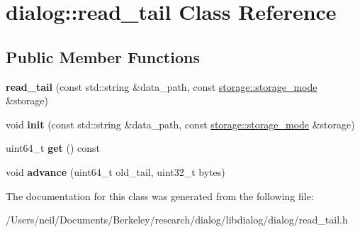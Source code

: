 \hypertarget{classdialog_1_1read__tail}{}\section{dialog\+:\+:read\+\_\+tail Class Reference}
\label{classdialog_1_1read__tail}
\subsection*{Public Member Functions}
\begin{DoxyCompactItemize}
\item 
\mbox{\label{classdialog_1_1read__tail_a2c33565f837dad30ceb0ca773eaf4332}} 
{\bfseries read\+\_\+tail} (const std\+::string \&data\+\_\+path, const \hyperlink{structdialog_1_1storage_1_1storage__mode}{storage\+::storage\+\_\+mode} \&storage)
\item 
\mbox{\label{classdialog_1_1read__tail_a61857cc04e420a980da27f07f86fb8bb}} 
void {\bfseries init} (const std\+::string \&data\+\_\+path, const \hyperlink{structdialog_1_1storage_1_1storage__mode}{storage\+::storage\+\_\+mode} \&storage)
\item 
\mbox{\label{classdialog_1_1read__tail_ae0ee05a10b3765b5df2be3321edee939}} 
uint64\+\_\+t {\bfseries get} () const
\item 
\mbox{\label{classdialog_1_1read__tail_a542d09c03134765b8a33665d9a01e23f}} 
void {\bfseries advance} (uint64\+\_\+t old\+\_\+tail, uint32\+\_\+t bytes)
\end{DoxyCompactItemize}


The documentation for this class was generated from the following file\+:\begin{DoxyCompactItemize}
\item 
/\+Users/neil/\+Documents/\+Berkeley/research/dialog/libdialog/dialog/read\+\_\+tail.\+h\end{DoxyCompactItemize}
